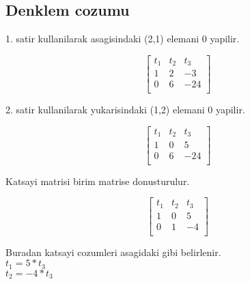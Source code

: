 \documentclass{article}
\begin{document}
\subsection{Denklem cozumu}
1. satir kullanilarak  asagisindaki (2,1) elemani 0 yapilir.\begin{center}
$$ \left[\begin{array}{rr|r}
t_{1} & t_{2} & t_{3}\\
1 & 2 & -3\\
0 & 6 & -24\\
\end{array}\right] $$
\end{center}
2. satir kullanilarak  yukarisindaki (1,2) elemani 0 yapilir.\begin{center}
$$ \left[\begin{array}{rr|r}
t_{1} & t_{2} & t_{3}\\
1 & 0 & 5\\
0 & 6 & -24\\
\end{array}\right] $$
\end{center}
Katsayi matrisi birim matrise donusturulur.
\begin{center}
$$ \left[\begin{array}{rr|r}
t_{1} & t_{2} & t_{3}\\
1 & 0 & 5\\
0 & 1 & -4\\
\end{array}\right] $$
\end{center}
Buradan katsayi cozumleri asagidaki gibi belirlenir.\\
$\displaystyle t_{1}=5*t_{3}$\\
$\displaystyle t_{2}=-4*t_{3}$\\
\end{document}
